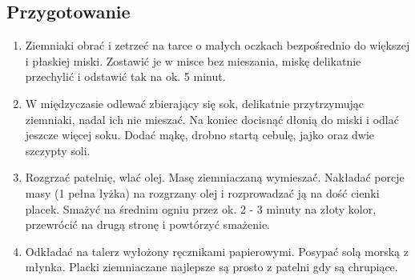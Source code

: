 \documentclass[a4paper]{article}
\begin{document}
\subsection{Przygotowanie}
\begin{enumerate}
	\item Ziemniaki obrać i zetrzeć na tarce o małych oczkach bezpośrednio do większej i płaskiej miski. Zostawić je w misce bez mieszania, miskę delikatnie przechylić i odstawić tak na ok. 5 minut.
	\item W międzyczasie odlewać zbierający się sok, delikatnie przytrzymując ziemniaki, nadal ich nie mieszać. Na koniec docisnąć dłonią do miski i odlać jeszcze więcej soku. Dodać mąkę, drobno startą cebulę, jajko oraz dwie szczypty soli.
	\item Rozgrzać patelnię, wlać olej. Masę ziemniaczaną wymieszać. Nakładać porcje masy (1 pełna łyżka) na rozgrzany olej i rozprowadzać ją na dość cienki placek. Smażyć na średnim ogniu przez ok. 2 - 3 minuty na złoty kolor, przewrócić na drugą stronę i powtórzyć smażenie.
	\item Odkładać na talerz wyłożony ręcznikami papierowymi. Posypać solą morską z młynka. Placki ziemniaczane najlepsze są prosto z patelni gdy są chrupiące.
\end{enumerate}
\end{document}
